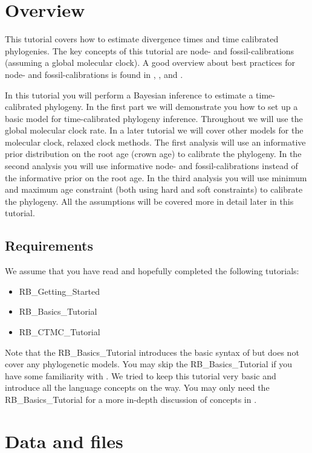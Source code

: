 \section{Overview}

This tutorial covers how to estimate divergence times and time calibrated phylogenies. 
The key concepts of this tutorial are node- and fossil-calibrations (assuming a global molecular clock).
A good overview about best practices for node- and fossil-calibrations is found in \cite{Parham2012}, \cite{Warnock2012}, \cite{Joyce2013} and \cite{Warnock2015}.

In this tutorial you will perform a Bayesian inference to estimate a time-calibrated phylogeny.
In the first part we will demonstrate you how to set up a basic model for time-calibrated phylogeny inference.
Throughout we will use the global molecular clock rate.
In a later tutorial we will cover other models for the molecular clock, \EG relaxed clock methods.
The first analysis will use an informative prior distribution on the root age (crown age) to calibrate the phylogeny.
In the second analysis you will use informative node- and fossil-calibrations instead of the informative prior on the root age.
In the third analysis you will use minimum and maximum age constraint (both using hard and soft constraints) to calibrate the phylogeny.
All the assumptions will be covered more in detail later in this tutorial.

\subsection*{Requirements}
We assume that you have read and hopefully completed the following tutorials:
\begin{itemize}
\item RB\_Getting\_Started
\item RB\_Basics\_Tutorial
\item RB\_CTMC\_Tutorial
\end{itemize}
Note that the RB\_Basics\_Tutorial introduces the basic syntax of \Rev but does not cover any phylogenetic models.
You may skip the RB\_Basics\_Tutorial if you have some familiarity with \R.
We tried to keep this tutorial very basic and introduce all the language concepts on the way.
You may only need the RB\_Basics\_Tutorial for a more in-depth discussion of concepts in \Rev.


\section{Data and files}\label{Sec:data}

